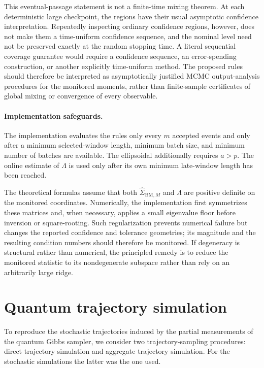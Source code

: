 \documentclass[showpacs,amsmath,amssymb,twocolumn,prx,superscriptaddress,10pt,aps,nofootinbib]{revtex4-2}
\begin{document}
This eventual-passage statement is not a finite-time mixing theorem. At each deterministic large checkpoint, the regions have their usual asymptotic confidence interpretation. Repeatedly inspecting ordinary confidence regions, however, does not make them a time-uniform confidence sequence, and the nominal level need not be preserved exactly at the random stopping time. A literal sequential coverage guarantee would require a confidence sequence, an error-spending construction, or another explicitly time-uniform method. The proposed rules should therefore be interpreted as asymptotically justified MCMC output-analysis procedures for the monitored moments, rather than finite-sample certificates of global mixing or convergence of every observable.

\paragraph{Implementation safeguards.}
The implementation evaluates the rules only every $m$ accepted events and only after a minimum selected-window length, minimum batch size, and minimum number of batches are available. The ellipsoidal additionally requires $a>p$. The online estimate of $\Lambda$ is used only after its own minimum late-window length has been reached.

The theoretical formulas assume that both $\widehat\Sigma_{\mathrm{BM},M}$ and $\Lambda$ are positive definite on the monitored coordinates. Numerically, the implementation first symmetrizes these matrices and, when necessary, applies a small eigenvalue floor before inversion or square-rooting. Such regularization prevents numerical failure but changes the reported confidence and tolerance geometries; its magnitude and the resulting condition numbers should therefore be monitored. If degeneracy is structural rather than numerical, the principled remedy is to reduce the monitored statistic to its nondegenerate subspace rather than rely on an arbitrarily large ridge.


\section{Quantum trajectory simulation}
\label{app:trajectory_simulation}

To reproduce the stochastic trajectories induced by the partial measurements of the quantum Gibbs sampler, we consider two trajectory-sampling procedures: direct trajectory simulation and aggregate trajectory simulation. For the stochastic simulations the latter was the one used.
\end{document}
